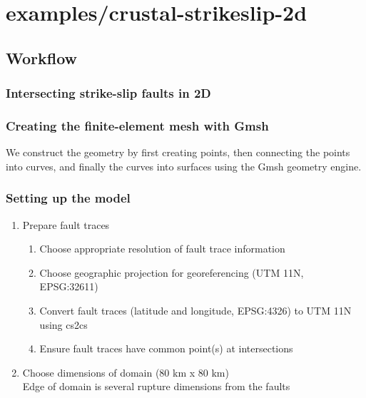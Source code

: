 \documentclass[aspectratio=169]{beamer}
\begin{document}
\section{{\ttfamily examples/crustal-strikeslip-2d}}
\subsection{Workflow}

\begin{frame}
  \frametitle{Intersecting strike-slip faults in 2D}

  
\end{frame}


\begin{frame}
  \frametitle{Creating the finite-element mesh with Gmsh}
  \summary{}

  We construct the geometry by first creating points, then connecting the points into curves, and finally the curves into surfaces using the Gmsh geometry engine.
  
  
\end{frame}


\begin{frame}
  \frametitle{Setting up the model}
  \summary{}
  
  \begin{enumerate}
  \item Prepare fault traces
    \begin{enumerate}
    \item Choose appropriate resolution of fault trace information
    \item Choose geographic projection for georeferencing (UTM 11N, {\ttfamily EPSG:32611})
    \item Convert fault traces (latitude and longitude, {\ttfamily EPSG:4326}) to UTM 11N using {\ttfamily cs2cs}
    \item Ensure fault traces have common point(s) at intersections
    \end{enumerate}\pause
  \item Choose dimensions of domain (80 km x 80 km)\\
    Edge of domain is several rupture dimensions from the faults
  \end{enumerate}
  
\end{frame}
\end{document}
